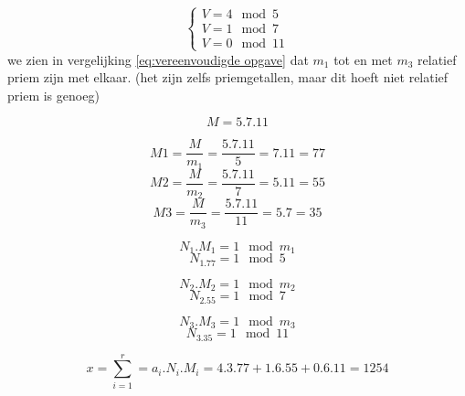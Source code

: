 \documentclass[12pt]{article}
\begin{document}
    \begin{equation} \label{eq:vereenvoudigde opgave}
        \begin{cases}
            V = 4 \mod 5 \\
            V = 1 \mod 7 \\
            V = 0 \mod 11
        \end{cases}
    \end{equation}
    we zien in vergelijking \ref{eq:vereenvoudigde opgave} dat $m_1$ tot en met $m_3$ relatief priem zijn met elkaar. (het zijn zelfs priemgetallen, maar dit hoeft niet relatief priem is genoeg)
    
    \begin{equation}
        M = 5.7.11
    \end{equation}
    
    \begin{equation}
        M1 = \frac{M}{m_1} = \frac{5.7.11}{5} = 7.11 = 77
    \end{equation}
    \begin{equation}
        M2 = \frac{M}{m_2} = \frac{5.7.11}{7} = 5.11 = 55
    \end{equation}
    \begin{equation}
        M3 = \frac{M}{m_3} = \frac{5.7.11}{11} = 5.7 = 35
    \end{equation}
    
    \begin{equation}
        N_1.M_1 = 1 \mod m_1
    \end{equation}
    \begin{equation}
        N_1.77 = 1 \mod 5
    \end{equation}
    
    \begin{equation}
        N_2.M_2 = 1 \mod m_2
    \end{equation}
    \begin{equation}
        N_2.55 = 1 \mod 7
    \end{equation}
    
    \begin{equation}
        N_3.M_3 = 1 \mod m_3
    \end{equation}
    \begin{equation}
        N_3.35 = 1 \mod 11
    \end{equation}
    
    \begin{equation}
        x = \sum_{i=1}^{r} = a_i.N_i.M_i = 4.3.77 + 1.6.55 + 0.6.11 = 1254
    \end{equation}
    
\end{document}
